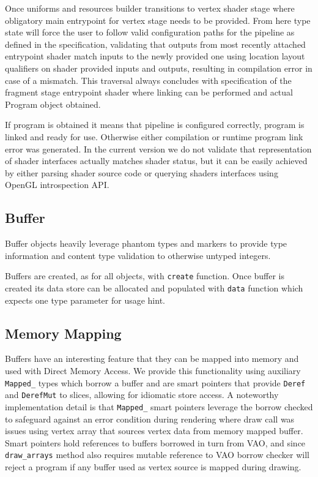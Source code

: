 Once uniforms and resources builder transitions to vertex shader stage where obligatory main entrypoint for vertex stage needs to be provided.
From here type state will force the user to follow valid configuration paths for the pipeline as defined in the specification, 
validating that outputs from most recently attached entrypoint shader match inputs to the newly provided one using location layout qualifiers 
on shader provided inputs and outputs, resulting in compilation error in case of a mismatch. 
This traversal always concludes with specification of the fragment stage entrypoint shader where linking can be performed and actual Program object obtained.

If program is obtained it means that pipeline is configured correctly, program is linked and ready for use. Otherwise either compilation or runtime program link error was generated.
In the current version we do not validate that representation of shader interfaces actually matches shader status, but it can be easily achieved 
by either parsing shader source code or querying shaders interfaces using OpenGL introspection API.

\subsection{Buffer}

Buffer objects heavily leverage phantom types and markers to provide type information and content type validation to otherwise untyped integers.

Buffers are created, as for all objects, with \texttt{create} function.
Once buffer is created its data store can be allocated and populated with \texttt{data} function which expects one type parameter for usage hint.

\subsection{Memory Mapping}

Buffers have an interesting feature that they can be mapped into memory and used with Direct Memory Access.
We provide this functionality using auxiliary \texttt{Mapped\_} types which borrow a buffer and are smart pointers that provide \texttt{Deref} and \texttt{DerefMut} to slices,
allowing for idiomatic store access. 
A noteworthy implementation detail is that \texttt{Mapped\_} smart pointers leverage the borrow checked to safeguard against an error condition during rendering
where draw call was issues using vertex array that sources vertex data from memory mapped buffer. 
Smart pointers hold references to buffers borrowed in turn from VAO, and since \texttt{draw\_arrays} method also requires mutable reference to VAO borrow checker will reject
a program if any buffer used as vertex source is mapped during drawing.


